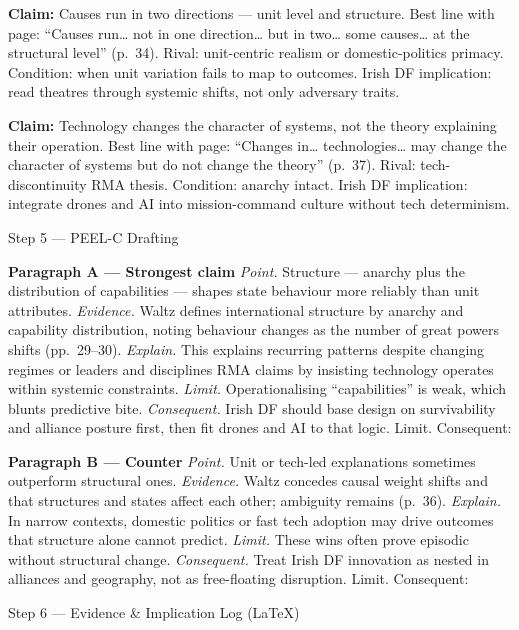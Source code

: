 \textbf{Claim:} Causes run in two directions — unit level and structure.
Best line with page: “Causes run… not in one direction… but in two… some causes… at the structural level” (p.~34). Rival: unit-centric realism or domestic-politics primacy. Condition: when unit variation fails to map to outcomes. Irish DF implication: read theatres through systemic shifts, not only adversary traits.

\textbf{Claim:} Technology changes the character of systems, not the theory explaining their operation.
Best line with page: “Changes in… technologies… may change the character of systems but do not change the theory” (p.~37). Rival: tech-discontinuity RMA thesis. Condition: anarchy intact. Irish DF implication: integrate drones and AI into mission-command culture without tech determinism.

Step 5 — PEEL-C Drafting

\textbf{Paragraph A — Strongest claim}
\textit{Point.} Structure — anarchy plus the distribution of capabilities — shapes state behaviour more reliably than unit attributes.
\textit{Evidence.} Waltz defines international structure by anarchy and capability distribution, noting behaviour changes as the number of great powers shifts (pp.~29–30).
\textit{Explain.} This explains recurring patterns despite changing regimes or leaders and disciplines RMA claims by insisting technology operates within systemic constraints.
\textit{Limit.} Operationalising “capabilities” is weak, which blunts predictive bite. \textit{Consequent.} Irish DF should base design on survivability and alliance posture first, then fit drones and AI to that logic. Limit. Consequent:

\textbf{Paragraph B — Counter}
\textit{Point.} Unit or tech-led explanations sometimes outperform structural ones.
\textit{Evidence.} Waltz concedes causal weight shifts and that structures and states affect each other; ambiguity remains (p.~36).
\textit{Explain.} In narrow contexts, domestic politics or fast tech adoption may drive outcomes that structure alone cannot predict.
\textit{Limit.} These wins often prove episodic without structural change. \textit{Consequent.} Treat Irish DF innovation as nested in alliances and geography, not as free-floating disruption. Limit. Consequent:

Step 6 — Evidence & Implication Log (LaTeX)

